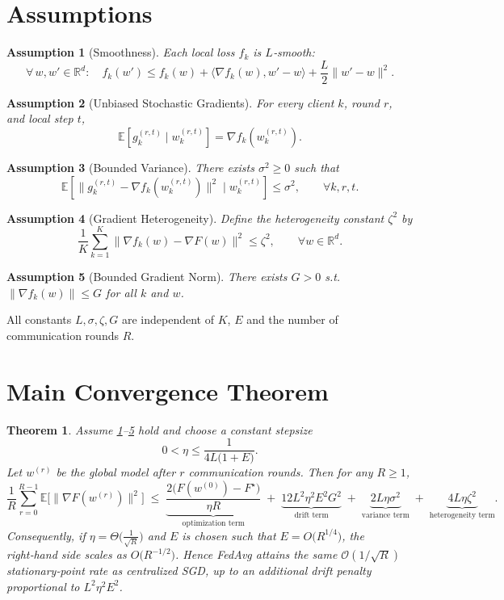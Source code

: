 \documentclass{article}
\newtheorem{theorem}{Theorem}
\newtheorem{assumption}{Assumption}
\newcommand{\E}{\mathbb{E}}
\newcommand{\R}{\mathbb{R}}
\begin{document}
\section*{Assumptions}
\begin{assumption}[Smoothness]\label{ass:smooth}
Each local loss $f_k$ is $L$‑smooth:
\[
\forall\,w,w'\in\R^d:\quad
f_k(w')\le f_k(w)+\langle\nabla f_k(w),w'-w\rangle
+\frac{L}{2}\|w'-w\|^2 .
\]
\end{assumption}

\begin{assumption}[Unbiased Stochastic Gradients]\label{ass:unbiased}
For every client $k$, round $r$, and local step $t$,
\[
\E\!\left[g_{k}^{(r,t)}\mid w_{k}^{(r,t)}\right]=\nabla f_k\!\left(w_{k}^{(r,t)}\right).
\]
\end{assumption}

\begin{assumption}[Bounded Variance]\label{ass:variance}
There exists $\sigma^2\ge0$ such that
\[
\E\!\left[\|g_{k}^{(r,t)}-\nabla f_k\!\left(w_{k}^{(r,t)}\right)\|^2
\mid w_{k}^{(r,t)}\right]\le\sigma^2,\qquad\forall k,r,t .
\]
\end{assumption}

\begin{assumption}[Gradient Heterogeneity]\label{ass:hetero}
Define the heterogeneity constant $\zeta^2$ by
\[
\frac{1}{K}\sum_{k=1}^{K}\bigl\|\nabla f_k(w)-\nabla F(w)\bigr\|^2
\le \zeta^2,\qquad\forall w\in\R^d .
\]
\end{assumption}

\begin{assumption}[Bounded Gradient Norm]\label{ass:bound}
There exists $G>0$ s.t. $\|\nabla f_k(w)\|\le G$ for all $k$ and $w$.
\end{assumption}

All constants $L,\sigma,\zeta,G$ are independent of $K$, $E$ and the number of
communication rounds $R$.

\section*{Main Convergence Theorem}
\begin{theorem}\label{thm:main}
Assume \ref{ass:smooth}–\ref{ass:bound} hold and choose a constant stepsize
\[
0<\eta\le\frac{1}{4L\bigl(1+E\bigr)} .
\]
Let $w^{(r)}$ be the global model after $r$ communication rounds.
Then for any $R\ge1$,
\[
\frac{1}{R}\sum_{r=0}^{R-1}\E\!\bigl[\|\nabla F(w^{(r)})\|^2\bigr]
\;\le\;
\underbrace{\frac{2\bigl(F(w^{(0)})-F^\star\bigr)}{\eta R}}_{\text{optimization term}}
\;+\;
\underbrace{12L^2\eta^2 E^2 G^2}_{\text{drift term}}
\;+\;
\underbrace{2L\eta\sigma^2}_{\text{variance term}}
\;+\;
\underbrace{4L\eta\zeta^2}_{\text{heterogeneity term}} .
\]
Consequently, if $\eta = \Theta\!\bigl(\tfrac{1}{\sqrt{R}}\bigr)$ and $E$ is
chosen such that $E = O\!\bigl(R^{1/4}\bigr)$, the right‑hand side scales as
$O\!\bigl(R^{-1/2}\bigr)$.  Hence FedAvg attains the same
$\mathcal{O}(1/\sqrt{R})$ stationary‑point rate as centralized SGD,
up to an additional drift penalty proportional to $L^2\eta^2E^2$.
\end{theorem}
\end{document}
